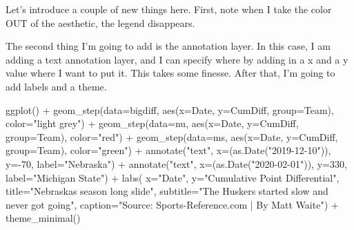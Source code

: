 \documentclass[
]{book}
\newenvironment{Shaded}{\begin{snugshade}}{\end{snugshade}}
\newcommand{\AttributeTok}[1]{\textcolor[rgb]{0.77,0.63,0.00}{#1}}
\newcommand{\DecValTok}[1]{\textcolor[rgb]{0.00,0.00,0.81}{#1}}
\newcommand{\FunctionTok}[1]{\textcolor[rgb]{0.00,0.00,0.00}{#1}}
\newcommand{\NormalTok}[1]{#1}
\newcommand{\SpecialCharTok}[1]{\textcolor[rgb]{0.00,0.00,0.00}{#1}}
\newcommand{\StringTok}[1]{\textcolor[rgb]{0.31,0.60,0.02}{#1}}
\begin{document}
Let's introduce a couple of new things here. First, note when I take the color OUT of the aesthetic, the legend disappears.

The second thing I'm going to add is the annotation layer. In this case, I am adding a text annotation layer, and I can specify where by adding in a x and a y value where I want to put it. This takes some finesse. After that, I'm going to add labels and a theme.

\begin{Shaded}
\begin{Highlighting}[]
\FunctionTok{ggplot}\NormalTok{() }\SpecialCharTok{+} 
  \FunctionTok{geom\_step}\NormalTok{(}\AttributeTok{data=}\NormalTok{bigdiff, }\FunctionTok{aes}\NormalTok{(}\AttributeTok{x=}\NormalTok{Date, }\AttributeTok{y=}\NormalTok{CumDiff, }\AttributeTok{group=}\NormalTok{Team), }\AttributeTok{color=}\StringTok{"light grey"}\NormalTok{) }\SpecialCharTok{+}
  \FunctionTok{geom\_step}\NormalTok{(}\AttributeTok{data=}\NormalTok{nu, }\FunctionTok{aes}\NormalTok{(}\AttributeTok{x=}\NormalTok{Date, }\AttributeTok{y=}\NormalTok{CumDiff, }\AttributeTok{group=}\NormalTok{Team), }\AttributeTok{color=}\StringTok{"red"}\NormalTok{) }\SpecialCharTok{+} 
  \FunctionTok{geom\_step}\NormalTok{(}\AttributeTok{data=}\NormalTok{ms, }\FunctionTok{aes}\NormalTok{(}\AttributeTok{x=}\NormalTok{Date, }\AttributeTok{y=}\NormalTok{CumDiff, }\AttributeTok{group=}\NormalTok{Team), }\AttributeTok{color=}\StringTok{"green"}\NormalTok{) }\SpecialCharTok{+}
  \FunctionTok{annotate}\NormalTok{(}\StringTok{"text"}\NormalTok{, }\AttributeTok{x=}\NormalTok{(}\FunctionTok{as.Date}\NormalTok{(}\StringTok{"2019{-}12{-}10"}\NormalTok{)), }\AttributeTok{y=}\SpecialCharTok{{-}}\DecValTok{70}\NormalTok{, }\AttributeTok{label=}\StringTok{"Nebraska"}\NormalTok{) }\SpecialCharTok{+}
  \FunctionTok{annotate}\NormalTok{(}\StringTok{"text"}\NormalTok{, }\AttributeTok{x=}\NormalTok{(}\FunctionTok{as.Date}\NormalTok{(}\StringTok{"2020{-}02{-}01"}\NormalTok{)), }\AttributeTok{y=}\DecValTok{330}\NormalTok{, }\AttributeTok{label=}\StringTok{"Michigan State"}\NormalTok{) }\SpecialCharTok{+}
  \FunctionTok{labs}\NormalTok{(}
    \AttributeTok{x=}\StringTok{"Date"}\NormalTok{, }
    \AttributeTok{y=}\StringTok{"Cumulative Point Differential"}\NormalTok{, }
    \AttributeTok{title=}\StringTok{"Nebraska\textquotesingle{}s season long slide"}\NormalTok{, }
    \AttributeTok{subtitle=}\StringTok{"The Huskers started slow and never got going"}\NormalTok{, }
    \AttributeTok{caption=}\StringTok{"Source: Sports{-}Reference.com | By Matt Waite"}\NormalTok{) }\SpecialCharTok{+}
  \FunctionTok{theme\_minimal}\NormalTok{()}
\end{Highlighting}
\end{Shaded}
\end{document}
